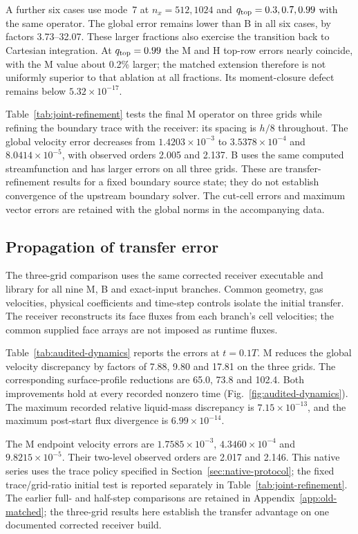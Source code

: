 \documentclass[10pt]{article}
\begin{document}


A further six cases use mode~7 at
$n_x=512,1024$ and $q_{\rm top}=0.3,0.7,0.99$ with the same operator.
The global error remains lower than B in all six cases, by factors
3.73--32.07. These larger
fractions also exercise the transition back to Cartesian integration.
At $q_{\rm top}=0.99$ the M and H top-row errors
nearly coincide, with the M value about 0.2\% larger; the matched
extension therefore is not uniformly superior to that ablation at all
fractions. Its moment-closure defect remains below $5.32\times10^{-17}$.

Table~\ref{tab:joint-refinement} tests the final M operator on three grids
while refining the boundary trace with the receiver: its spacing is $h/8$
throughout. The global velocity error decreases from $1.4203\times10^{-3}$
to $3.5378\times10^{-4}$ and $8.0414\times10^{-5}$, with observed orders
2.005 and 2.137. B uses the same computed streamfunction and has larger
errors on all three grids. These are transfer-refinement results for a
fixed boundary source state; they do not establish convergence of the
upstream boundary solver. The cut-cell errors and maximum vector errors
are retained with the global norms in the accompanying data.


\subsection{Propagation of transfer error}\label{sec:dynamic-results}
The three-grid comparison uses the same corrected receiver executable and
library for all nine M, B and exact-input branches. Common geometry, gas
velocities, physical coefficients and time-step controls isolate the
initial transfer. The receiver reconstructs its face fluxes from each
branch's cell velocities; the common supplied face arrays are not imposed
as runtime fluxes.

Table~\ref{tab:audited-dynamics} reports the errors at $t=0.1T$.
M reduces the global velocity discrepancy by factors of 7.88, 9.80 and
17.81 on the three grids. The corresponding surface-profile reductions
are 65.0, 73.8 and 102.4. Both improvements hold at every recorded
nonzero time (Fig.~\ref{fig:audited-dynamics}). The maximum recorded
relative liquid-mass discrepancy is $7.15\times10^{-13}$, and the maximum
post-start flux divergence is $6.99\times10^{-14}$.

The M endpoint velocity errors are $1.7585\times10^{-3}$,
$4.3460\times10^{-4}$ and $9.8215\times10^{-5}$.
Their two-level observed orders are 2.017 and 2.146. This native series
uses the trace policy specified in Section~\ref{sec:native-protocol};
the fixed trace/grid-ratio initial test is reported separately in
Table~\ref{tab:joint-refinement}. The earlier full- and half-step
comparisons are retained in Appendix~\ref{app:old-matched}; the three-grid
results here establish the transfer advantage on one documented corrected
receiver build.

\end{document}
